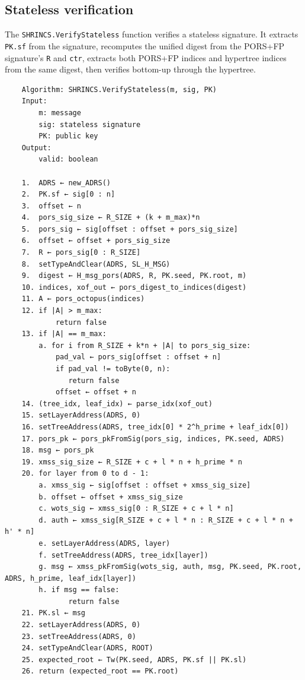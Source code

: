\subsection{Stateless verification}
The \texttt{SHRINCS.VerifyStateless} function verifies a stateless signature. It extracts \texttt{PK.sf} from the signature, recomputes the unified digest from the PORS+FP signature's \texttt{R} and \texttt{ctr}, extracts both PORS+FP indices and hypertree indices from the same digest, then verifies bottom-up through the hypertree.
\begin{verbatim}
    Algorithm: SHRINCS.VerifyStateless(m, sig, PK)
    Input:
        m: message
        sig: stateless signature
        PK: public key
    Output:
        valid: boolean

    1.  ADRS ← new_ADRS()
    2.  PK.sf ← sig[0 : n]
    3.  offset ← n
    4.  pors_sig_size ← R_SIZE + (k + m_max)*n
    5.  pors_sig ← sig[offset : offset + pors_sig_size]
    6.  offset ← offset + pors_sig_size
    7.  R ← pors_sig[0 : R_SIZE]
    8.  setTypeAndClear(ADRS, SL_H_MSG)
    9.  digest ← H_msg_pors(ADRS, R, PK.seed, PK.root, m)
    10. indices, xof_out ← pors_digest_to_indices(digest)
    11. A ← pors_octopus(indices)
    12. if |A| > m_max:
            return false
    13. if |A| == m_max:
        a. for i from R_SIZE + k*n + |A| to pors_sig_size:
            pad_val ← pors_sig[offset : offset + n]
            if pad_val != toByte(0, n):
               return false
            offset ← offset + n
    14. (tree_idx, leaf_idx) ← parse_idx(xof_out)
    15. setLayerAddress(ADRS, 0)
    16. setTreeAddress(ADRS, tree_idx[0] * 2^h_prime + leaf_idx[0])
    17. pors_pk ← pors_pkFromSig(pors_sig, indices, PK.seed, ADRS)
    18. msg ← pors_pk
    19. xmss_sig_size ← R_SIZE + c + l * n + h_prime * n
    20. for layer from 0 to d - 1:
        a. xmss_sig ← sig[offset : offset + xmss_sig_size]
        b. offset ← offset + xmss_sig_size
        c. wots_sig ← xmss_sig[0 : R_SIZE + c + l * n]
        d. auth ← xmss_sig[R_SIZE + c + l * n : R_SIZE + c + l * n + h' * n]
        e. setLayerAddress(ADRS, layer)
        f. setTreeAddress(ADRS, tree_idx[layer])
        g. msg ← xmss_pkFromSig(wots_sig, auth, msg, PK.seed, PK.root, ADRS, h_prime, leaf_idx[layer])
        h. if msg == false:
               return false
    21. PK.sl ← msg
    22. setLayerAddress(ADRS, 0)
    23. setTreeAddress(ADRS, 0)
    24. setTypeAndClear(ADRS, ROOT)
    25. expected_root ← Tw(PK.seed, ADRS, PK.sf || PK.sl)
    26. return (expected_root == PK.root)
\end{verbatim}

